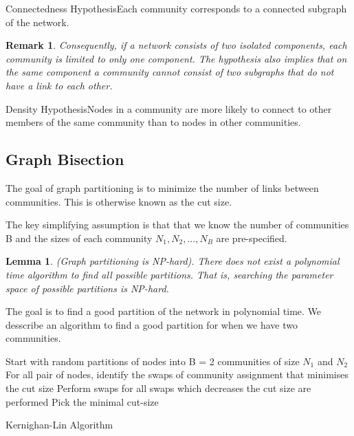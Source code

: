\documentclass[twoside]{article}
\newtheorem{lemma}[theorem]{Lemma}
\newtheorem{remark}[theorem]{Remark}
\begin{document}
\begin{definition_exam}{Connectedness Hypothesis}{}Each community corresponds to a connected subgraph of the network.
\end{definition_exam}
\begin{remark} Consequently, if a network consists of two isolated components, each community is limited to only one component. The hypothesis also implies that on the same component a community cannot consist of two subgraphs that do not have a link to each other. 
\end{remark}

\begin{definition_exam}{Density Hypothesis}{}Nodes in a community are more likely to connect to other members of the same community than to nodes in other communities.
\end{definition_exam}

\subsection{Graph Bisection}
The goal of graph partitioning is to minimize the number of links between communities. This is otherwise known as the cut size.

The key simplifying assumption is that that we know the number of communities B and the sizes of each community $N_1,N_2,...,N_B$ are pre-specified.


\begin{lemma}(Graph partitioning is NP-hard). There does not exist a polynomial time algorithm to find all possible partitions. That is, searching the parameter space of possible partitions is NP-hard.
\end{lemma}

The goal is to find a good partition of the network in polynomial time. We desscribe an algorithm to find a good partition for when we have two communities.

\begin{algorithm}
\DontPrintSemicolon
{}
Start with random partitions of nodes into B = 2 communities of size $N_1$ and $N_2$\;
For all pair of nodes, identify the swaps of community assignment that minimises the cut size\;
Perform swaps for all swaps which decreases the cut size are performed\;
Pick the minimal cut-size\;
\;
\caption{{\sc Kernighan-Lin Algorithm}}
\label{algo:duplicate}
\end{algorithm}
\end{document}
